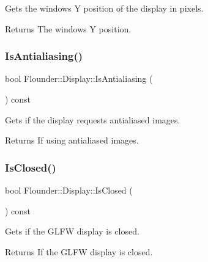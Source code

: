Gets the windows Y position of the display in pixels. 

\begin{DoxyReturn}{Returns}
The windows Y position. 
\end{DoxyReturn}
\mbox{\label{class_flounder_1_1_display_a844a9b3c9c2c862abf7abe5a5a1da767}} 
\subsubsection{\texorpdfstring{Is\+Antialiasing()}{IsAntialiasing()}}
{\footnotesize\ttfamily bool Flounder\+::\+Display\+::\+Is\+Antialiasing (\begin{DoxyParamCaption}{ }\end{DoxyParamCaption}) const\hspace{0.3cm}{\ttfamily [inline]}}



Gets if the display requests antialiased images. 

\begin{DoxyReturn}{Returns}
If using antialiased images. 
\end{DoxyReturn}
\mbox{\label{class_flounder_1_1_display_a70757967090cb967b3a67adccb22f9d1}} 
\subsubsection{\texorpdfstring{Is\+Closed()}{IsClosed()}}
{\footnotesize\ttfamily bool Flounder\+::\+Display\+::\+Is\+Closed (\begin{DoxyParamCaption}{ }\end{DoxyParamCaption}) const\hspace{0.3cm}{\ttfamily [inline]}}



Gets if the G\+L\+FW display is closed. 

\begin{DoxyReturn}{Returns}
If the G\+L\+FW display is closed. 
\end{DoxyReturn}
\mbox{\label{class_flounder_1_1_display_a9119c09b79c10f4b68ef63244daea1fc}} 
